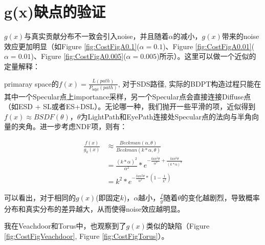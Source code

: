 \section{g(x)缺点的验证}
\label{sec:cost}
$g(x)$与真实贡献分布不一致会引入noise，并且随着$\alpha$的减小，$g(x)$带来的noise效应更加明显（如Figure \ref{fig:CostFigA0.1}($\alpha=0.1$)、Figure \ref{fig:CostFigA0.01}($\alpha=0.01$)、Figure \ref{fig:CostFigA0.005}($\alpha=0.005$)所示）。这里可以做一个近似的定量解释：

primaray space的$f(x) = \frac{L(path)}{P_{bdpt}(path)}$, 对于SDS路径, 实际的BDPT构造过程只能在其中一个Specular点上importance采样，另一个Specular点会直接连接Diffuse点（如ESD + SL或者ES+DSL）。无论哪一种，我们抛开一些平滑的项，近似得到$f(x)\approx BSDF(\theta)$，$\theta$为LightPath和EyePath连接处Specular点的法向与半角向量的夹角。进一步考虑NDF项，则有：

\begin{align}
\frac{f(x)}{g_k(x)} &\approx \frac{Beckman(\alpha, \theta)}{Beckman(k*\alpha, \theta)} \\
  &= \frac{(k*\alpha)^2}{\alpha^2} * e^{-\frac{tan^2\theta}{\alpha^2} + \frac{tan^2\theta}{(k*\alpha)^2}}\\
  &= k^2 * e^{-\frac{tan^2\theta}{\alpha^2} * (1 - \frac{1}{k^2})}
\end{align}

可以看出，对于相同的$g(x)$(即固定$k$)，$\alpha$越小，$\frac{f}{g}$随着$\theta$的变化越剧烈，导致概率分布和真实分布的差异越大，从而使得noise效应越明显。

我在Veachdoor和Torus中，也观察到了$g(x)$类似的缺陷（Figure \ref{fig:CostFigVeachdoor}, Figure \ref{fig:CostFigTorus}）。



